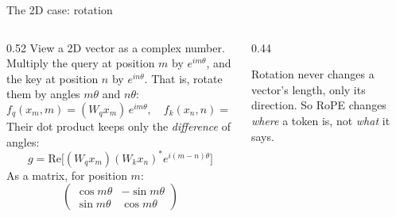 \documentclass[aspectratio=169,11pt]{beamer}
\begin{document}
\begin{frame}{The 2D case: rotation}
  \begin{columns}[T]
    \begin{column}{0.52\textwidth}
      \small
      View a 2D vector as a complex number. Multiply the query at position $m$ by $e^{im\theta}$, and the key at position $n$ by $e^{in\theta}$. That is, rotate them by angles $m\theta$ and $n\theta$:
      \[
        f_q(x_m,m)=(W_qx_m)\,e^{im\theta},\quad f_k(x_n,n)=(W_kx_n)\,e^{in\theta}
      \]
      Their dot product keeps only the \emph{difference} of angles:
      \[
        g=\text{Re}\big[(W_qx_m)(W_kx_n)^{*}e^{i(m-n)\theta}\big]
      \]
      As a matrix, for position $m$:
      \[
        \begin{pmatrix}\cos m\theta & -\sin m\theta\\ \sin m\theta & \cos m\theta\end{pmatrix}
      \]
    \end{column}
    \begin{column}{0.44\textwidth}
      \centering
      \vspace{1mm}

      \small
      Rotation never changes a vector's length, only its direction. So RoPE changes \emph{where} a token is, not \emph{what} it says.
    \end{column}
  \end{columns}
\end{frame}
\end{document}
